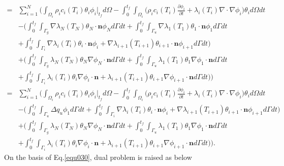 \documentclass[UTF-8]{article}
\begin{document}
\begin{align}\label{equ031}
	=& \sum_{i=1}^N \bigg( \int_{\Omega_i} \rho_i c_i(T_i)\theta_i \phi_i \big|_{t_f} d\Omega - \int_0^{t_f} \int_{\Omega_i} \Big( \rho_i c_i(T_i) \frac{\partial \phi_i}{\partial t} + \lambda_i(T_i) \nabla \cdot \nabla \phi_i \Big)  \theta_i d\Omega dt \nonumber \\
	&- \Big( \int_0^{t_f} \int_{\Gamma_g} \nabla \lambda_N(T_N) \theta_N \cdot \pmb{n} \phi_N d\Gamma dt + \int_0^{t_f} \int_{\Gamma_u} \nabla \lambda_1(T_1) \theta_1 \cdot \pmb{n} \phi_1 d\Gamma dt \nonumber \\
	&+ \int_0^{t_f} \int_{\Gamma_{i}} \nabla \lambda_i(T_i) \theta_i \cdot \pmb{n} \phi_i + \nabla \lambda_{i+1}(T_{i+1}) \theta_{i+1} \cdot \pmb{n} \phi_{i+1} d\Gamma dt \Big) \nonumber \\
	&+ \Big( \int_0^{t_f} \int_{\Gamma_g} \lambda_N(T_N) \theta_N \nabla \phi_N \cdot \pmb{n} d\Gamma dt + \int_0^{t_f} \int_{\Gamma_u} \lambda_1(T_1) \theta_1 \nabla \phi_1 \cdot \pmb{n} d\Gamma dt \nonumber \\
	&+ \int_0^{t_f} \int_{\Gamma_{i}} \lambda_i(T_i) \theta_i \nabla \phi_i \cdot \pmb{n} + \lambda_{i+1}(T_{i+1}) \theta_{i+1} \nabla \phi_{i+1} \cdot \pmb{n}d\Gamma dt\Big) \bigg) \nonumber \\
	=& \sum_{i=1}^N \bigg( \int_{\Omega_i} \rho_i c_i(T_i)\theta_i \phi_i \big|_{t_f} d\Omega - \int_0^{t_f} \int_{\Omega_i} \Big( \rho_i c_i(T_i) \frac{\partial \phi_i}{\partial t} + \lambda_i(T_i) \nabla \cdot \nabla \phi_i \Big)  \theta_i d\Omega dt \nonumber \\
	&- \Big( \int_0^{t_f} \int_{\Gamma_u} \Delta q_u \phi_1 d\Gamma dt + \int_0^{t_f} \int_{\Gamma_{i}} \nabla \lambda_i(T_i) \theta_i \cdot \pmb{n} \phi_i + \nabla \lambda_{i+1}(T_{i+1}) \theta_{i+1} \cdot \pmb{n} \phi_{i+1} d\Gamma dt \Big) \nonumber \\
	&+ \Big( \int_0^{t_f} \int_{\Gamma_g} \lambda_N(T_N) \theta_N \nabla \phi_N \cdot \pmb{n} d\Gamma dt + \int_0^{t_f} \int_{\Gamma_u} \lambda_1(T_1) \theta_1 \nabla \phi_1 \cdot \pmb{n} d\Gamma dt \nonumber \\
	&+ \int_0^{t_f} \int_{\Gamma_{i}} \lambda_i(T_i) \theta_i \nabla \phi_i \cdot \pmb{n} + \lambda_{i+1}(T_{i+1}) \theta_{i+1} \nabla \phi_{i+1} \cdot \pmb{n}d\Gamma dt\Big) \bigg).
\end{align}
On the basis of Eq.\ref{equ030}, dual problem is raised as below
\end{document}
